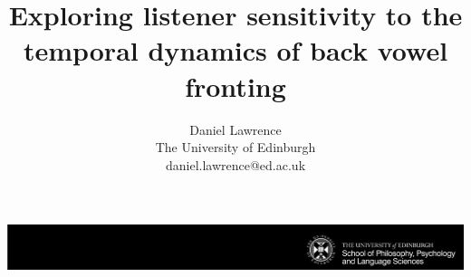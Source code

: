 \documentclass[a0,final]{a0poster}
\title{\Huge{Exploring listener sensitivity to the temporal dynamics of back vowel fronting}}
\author{Daniel Lawrence\\The University of Edinburgh\\\hspace{0.5cm}daniel.lawrence@ed.ac.uk}
\begin{document}
\hspace{-4cm}								%
\vspace{-2cm}
\includegraphics{Black_Landscape.pdf}

\begin{minipage}{1191mm}					%
\vspace{-18cm}
\maketitle
\end{minipage}
\vspace{.5cm}
\end{document}
